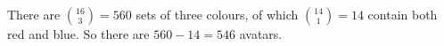 There are $\binom{16}{3}=560$ sets of three colours, of which $\binom{14}{1}=14$ contain both red and blue. So there are $560-14=\boxed{546}$ avatars.
